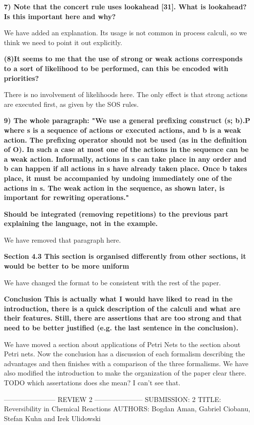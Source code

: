 \documentclass{article}
\begin{document}
\textbf{7) Note that the concert rule uses lookahead [31].
What is lookahead? Is this important here and why?}

We have added an explanation. Its usage is not common in process calculi, so we think we need to point it out explicitly.

\textbf{(8)It seems to me that the use of strong or weak actions corresponds to a sort of likelihood to be performed, can this be encoded with priorities?}

There is no involvement of likelihoods here. The only effect is that strong actions are executed first, as given by the SOS rules.

\textbf{9) The whole paragraph:
"We use a general prefixing construct (s; b).P where s is a sequence of actions or executed actions, and b is a weak action. The prefixing operator should not be used (as in the definition of O). In such a case at most one of the actions in the sequence can be a weak action. Informally, actions in s can take place in any order and b can happen if all actions in s have already taken place. Once b takes place, it must be accompanied by undoing immediately one of the actions in s. The weak action in the sequence, as shown later, is important for rewriting operations."}

\textbf{Should be integrated (removing repetitions) to the previous part explaining the language, not in the example.}

We have removed that paragraph here.

\textbf{Section 4.3
This section is organised differently from other sections, it would be better to be more uniform}

We have changed the format to be consistent with the rest of the paper. 

\textbf{Conclusion
This is actually what I would have liked to read in the introduction, there is a quick description of the calculi and what are their features.
Still, there are assertions that are too strong and that need to be better justified (e.g. the last sentence in the conclusion).}

We have moved a section about applications of Petri Nets to the section about Petri nets. Now the conclusion has a discussion of each formalism describing the advantages and then finishes with a comparison of the three formalisms. We have also modified the introduction to make the organization of the paper clear there.
TODO which assertations does she mean? I can't see that.

----------------------- REVIEW 2 ---------------------
SUBMISSION: 2
TITLE: Reversibility in Chemical Reactions
AUTHORS: Bogdan Aman, Gabriel Ciobanu, Stefan Kuhn and Irek Ulidowski
\end{document}
